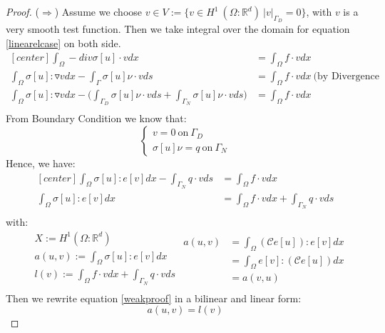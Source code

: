 \documentclass[a4paper,11pt]{article}
\newcommand{\R}{\mathbb{R}}
\newcommand{\Cmod}{\mathcal{C}}
\begin{document}
\begin{proof}
	($\Rightarrow$)
	Assume we choose $v \in V:= \{ v \in H^1\ (\Omega : \R^d)\ |v|_{\Gamma_D} = 0 \}$, with $v$ is a very smooth test function. Then we take integral over the domain for equation \eqref{linearelcase} on both side.
	\begin{equation*}
	\begin{aligned}[center]
	\int_\Omega -div\sigma[u] \cdot v dx &= \int_\Omega f \cdot v dx\\
	\int_\Omega \sigma[u] : \triangledown v dx - \int_\Gamma \sigma[u]\nu \cdot v ds &= \int_\Omega f \cdot v dx\  \text{(by Divergence Formula)}\\
	\int_\Omega \sigma[u] : \triangledown v dx - \bigg(\int_{\Gamma_D} \sigma[u]\nu \cdot v ds + \int_{\Gamma_N} \sigma[u]\nu \cdot v ds\bigg) &= \int_\Omega f \cdot v dx\\	
	\end{aligned}
	\end{equation*}
	From Boundary Condition we know that:
	\begin{equation*}
	\begin{cases}
	v = 0\ \text{on}\ \Gamma_D\\
	\sigma[u] \nu = q\ \text{on}\ \Gamma_N
	\end{cases}
	\end{equation*}
	Hence, we have:
	\begin{equation}\label{weakproof}
	\begin{aligned}[center]
	\int_\Omega \sigma[u] : e[v] dx - \int_{\Gamma_N} q \cdot v ds &= \int_\Omega f \cdot v dx\\
	\int_\Omega \sigma[u] : e[v] dx &= \int_\Omega f \cdot v dx + \int_{\Gamma_N} q \cdot v ds \\
	\end{aligned}
	\end{equation}
	with:
	\begin{equation*}
	\begin{aligned}
	&X:= H^1(\Omega : \R^d)\\
	&a(u,v) := \int_\Omega \sigma[u] : e[v] dx\\
	&l(v) := \int_\Omega f\cdot v dx + \int_{\Gamma_N} q \cdot v ds\\
	\end{aligned}
	\begin{aligned}
	a(u,v) &= \int_\Omega (\Cmod e[u]) : e[v] dx\\
	&= \int_\Omega e[v] : (\Cmod e[u]) dx\\
	&= a(v,u)
	\end{aligned}
	\end{equation*}
	Then we rewrite equation \eqref{weakproof} in a bilinear and linear form:
	\begin{equation*}
	a(u,v) = l(v)
	\end{equation*}
	

\end{proof}
\end{document}
